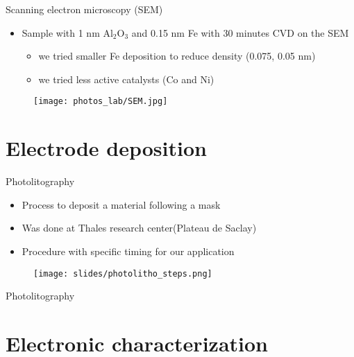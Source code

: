 \documentclass{beamer}
\begin{document}
\begin{frame}{Scanning electron microscopy (SEM)}
\begin{itemize}
    \item Sample with 1 nm Al$_2$O$_3$ and 0.15 nm Fe with 30 minutes CVD on the SEM
    \begin{itemize}
        \item we tried smaller Fe deposition to reduce density (0.075, 0.05 nm)
        \item we tried less active catalysts (Co and Ni)
    \end{itemize}
\end{itemize}
\begin{figure}
    \centering
    \texttt{[image: photos\_lab/SEM.jpg]}
    \label{fig:SEM}
\end{figure}
\end{frame}

\section{Electrode deposition}

\begin{frame}{Photolitography}
    \begin{itemize}
        \item Process to deposit a material following a mask
        \item Was done at Thales research center(Plateau de Saclay)
        \item Procedure with specific timing for our application
    \end{itemize}
    \begin{figure}
        \centering
        \texttt{[image: slides/photolitho\_steps.png]}
    \end{figure}
\end{frame}

\begin{frame}{Photolitography}
    \begin{figure}[h]
        \centering
    \end{figure}
\end{frame}

\section{Electronic characterization}
\end{document}
